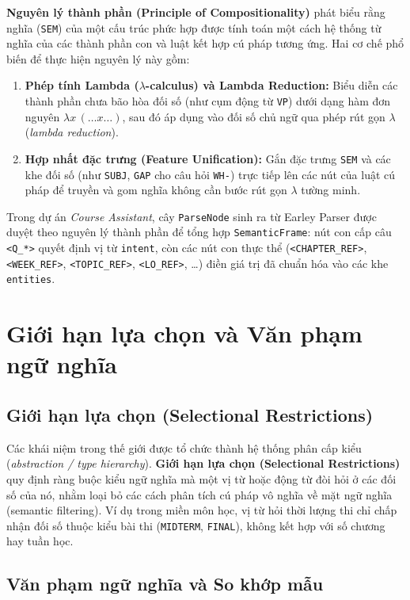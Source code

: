\textbf{Nguyên lý thành phần (Principle of Compositionality)} phát biểu rằng nghĩa (\texttt{SEM}) của một cấu trúc phức hợp được tính toán một cách hệ thống từ nghĩa của các thành phần con và luật kết hợp cú pháp tương ứng. Hai cơ chế phổ biến để thực hiện nguyên lý này gồm:
\begin{enumerate}
  \item \textbf{Phép tính Lambda ($\lambda$-calculus) và Lambda Reduction:} Biểu diễn các thành phần chưa bão hòa đối số (như cụm động từ \texttt{VP}) dưới dạng hàm đơn nguyên $\lambda x\,(\dots x \dots)$, sau đó áp dụng vào đối số chủ ngữ qua phép rút gọn $\lambda$ (\emph{lambda reduction}).
  \item \textbf{Hợp nhất đặc trưng (Feature Unification):} Gắn đặc trưng \texttt{SEM} và các khe đối số (như \texttt{SUBJ}, \texttt{GAP} cho câu hỏi \texttt{WH-}) trực tiếp lên các nút của luật cú pháp để truyền và gom nghĩa không cần bước rút gọn $\lambda$ tường minh.
\end{enumerate}

Trong dự án \emph{Course Assistant}, cây \texttt{ParseNode} sinh ra từ Earley Parser được duyệt theo nguyên lý thành phần để tổng hợp \texttt{SemanticFrame}: nút con cấp câu \texttt{<Q\_*>} quyết định vị từ \texttt{intent}, còn các nút con thực thể (\texttt{<CHAPTER\_REF>}, \texttt{<WEEK\_REF>}, \texttt{<TOPIC\_REF>}, \texttt{<LO\_REF>}, \dots) điền giá trị đã chuẩn hóa vào các khe \texttt{entities}.

\section{Giới hạn lựa chọn và Văn phạm ngữ nghĩa}

\subsection{Giới hạn lựa chọn (Selectional Restrictions)}

Các khái niệm trong thế giới được tổ chức thành hệ thống phân cấp kiểu (\emph{abstraction / type hierarchy}). \textbf{Giới hạn lựa chọn (Selectional Restrictions)} quy định ràng buộc kiểu ngữ nghĩa mà một vị từ hoặc động từ đòi hỏi ở các đối số của nó, nhằm loại bỏ các cách phân tích cú pháp vô nghĩa về mặt ngữ nghĩa (semantic filtering). Ví dụ trong miền môn học, vị từ hỏi thời lượng thi chỉ chấp nhận đối số thuộc kiểu bài thi (\texttt{MIDTERM}, \texttt{FINAL}), không kết hợp với số chương hay tuần học.

\subsection{Văn phạm ngữ nghĩa và So khớp mẫu}

